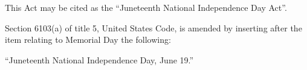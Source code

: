 \documentclass{bill-usa}
\begin{document}

This Act may be cited as the “Juneteenth National Independence Day Act”.


Section 6103(a) of title 5, United States Code, is amended by inserting after the item relating to Memorial Day the following:


\hspace{0.25in}``Juneteenth National Independence Day, June 19.''
\end{document}
